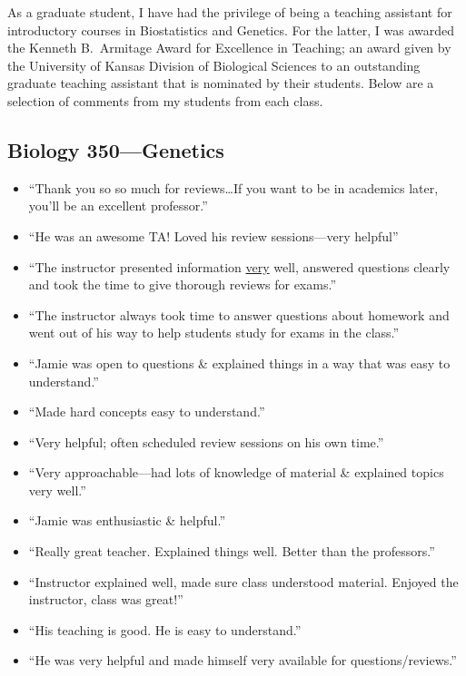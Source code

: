 \documentclass[10pt]{article}
\newenvironment{myItemize}{
  \begin{itemize}
    \setlength{\leftskip}{-4mm}
    \setlength{\itemsep}{0.25em}
    \setlength{\parskip}{0pt}
    \setlength{\parsep}{0.5em}}
  {\end{itemize}}
\begin{document}
\singlespacing

As a graduate student, I have had the privilege of being a teaching assistant for
introductory courses in Biostatistics and Genetics.
For the latter, I was awarded the Kenneth B.\ Armitage Award for Excellence in
Teaching; an award given by the University of Kansas Division of Biological
Sciences to an outstanding graduate teaching assistant that is nominated by
their students.
Below are a selection of comments from my students from each class.

\begin{multicols}{2}
\subsection*{Biology 350---Genetics}
\begin{myItemize}
\sffamily
\item ``Thank you so so much for reviews\ldots If you want to be in academics later, you'll be an excellent professor.''
\item ``He was an awesome TA! Loved his review sessions---very helpful''
\item ``The instructor presented information \underline{very} well, answered questions clearly and took the time to give thorough reviews for exams.''
\item ``The instructor always took time to answer questions about homework and went out of his way to help students study for exams in the class.''
\item ``Jamie was open to questions \& explained things in a way that was easy to understand.''
\item ``Made hard concepts easy to understand.''
\item ``Very helpful; often scheduled review sessions on his own time.''
\item ``Very approachable---had lots of knowledge of material \& explained topics very well.''
\item ``Jamie was enthusiastic \& helpful.''
\item ``Really great teacher. Explained things well. Better than the professors.''
\item ``Instructor explained well, made sure class understood material. Enjoyed the instructor, class was great!''
\item ``His teaching is good. He is easy to understand.''
\item ``He was very helpful and made himself very available for questions/reviews.''


\end{myItemize}
\end{multicols}
\end{document}
